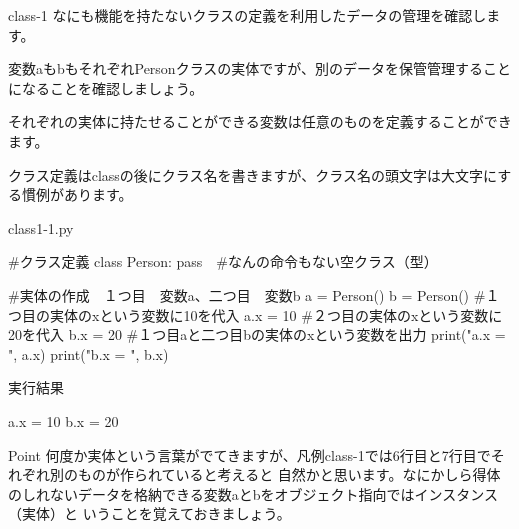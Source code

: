 \begin{pabox}{class-1}
なにも機能を持たないクラスの定義を利用したデータの管理を確認します。

変数aもbもそれぞれPersonクラスの実体ですが、別のデータを保管管理することになることを確認しましょう。

それぞれの実体に持たせることができる変数は任意のものを定義することができます。


クラス定義はclassの後にクラス名を書きますが、クラス名の頭文字は大文字にする慣例があります。
\begin{legbox}{class1-1.py}
\begin{listing}{1}
#クラス定義
class Person:
    pass　#なんの命令もない空クラス（型）
    
#実体の作成　１つ目　変数a、二つ目　変数b
a = Person()
b = Person()
#１つ目の実体のxという変数に10を代入
a.x = 10
#２つ目の実体のxという変数に20を代入
b.x = 20
#１つ目aと二つ目bの実体のxという変数を出力 
print("a.x = ", a.x)
print("b.x = ", b.x)
\end{listing}
実行結果
\begin{listing}{1}
a.x =  10
b.x =  20
\end{listing}
\end{legbox}
\end{pabox}
\begin{hipoint}{Point}
何度か実体という言葉がでてきますが、凡例class-1では6行目と7行目でそれぞれ別のものが作られていると考えると
自然かと思います。なにかしら得体のしれないデータを格納できる変数aとbをオブジェクト指向ではインスタンス（実体）と
いうことを覚えておきましょう。
\end{hipoint}

